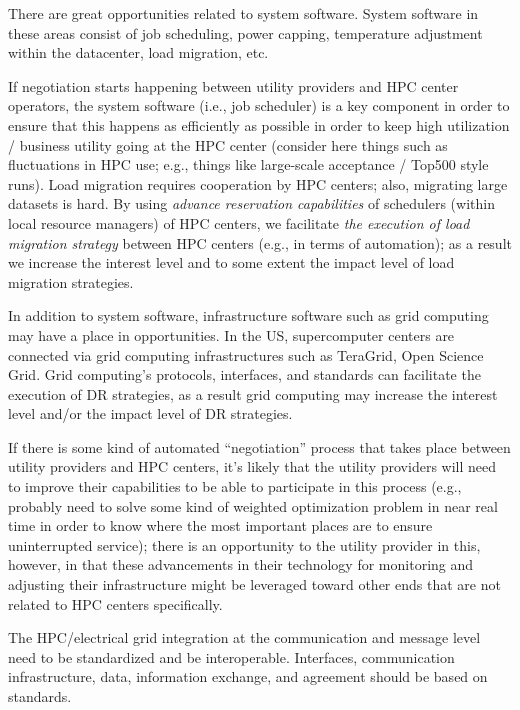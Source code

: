 \documentclass{llncs}
\begin{document}
There are great opportunities related to system software. System software in these areas consist of job scheduling, power capping, temperature adjustment within the datacenter, load migration, etc.

If negotiation starts happening between utility providers and HPC center operators, the system software (i.e., job scheduler) is a key component in order to ensure that this happens as efficiently as possible in order to keep high utilization / business utility going at the HPC center (consider here things such as fluctuations in HPC use; e.g., things like large-scale acceptance / Top500 style runs). Load migration requires cooperation by HPC centers; also, migrating large datasets is hard. By using \textit{advance reservation capabilities} of schedulers (within local resource managers) of HPC centers, we facilitate \textit{the execution of load migration strategy} between HPC centers (e.g., in terms of automation); as a result we increase the interest level and to some extent the impact level of load migration strategies.

In addition to system software, infrastructure software such as grid computing may have a place in opportunities. In the US, supercomputer centers are connected via grid computing infrastructures such as TeraGrid, Open Science Grid. Grid computing's protocols, interfaces, and standards can facilitate the execution of DR strategies, as a result grid computing may increase the interest level and/or the impact level of DR strategies.

If there is some kind of automated ``negotiation'' process that takes place between utility providers and HPC centers, it's likely that the utility providers will need to improve their capabilities to be able to participate in this process (e.g., probably need to solve some kind of weighted optimization problem in near real time in order to know where the most important places are to ensure uninterrupted service); there is an opportunity to the utility provider in this, however, in that these advancements in their technology for monitoring and adjusting their infrastructure might be leveraged toward other ends that are not related to HPC centers specifically.

The HPC/electrical grid integration at the communication and message level need to be standardized and be interoperable. Interfaces, communication infrastructure, data, information exchange, and agreement should be based on standards.
\end{document}
